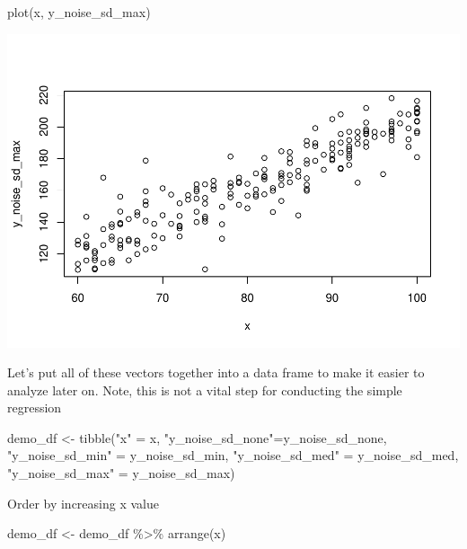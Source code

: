\documentclass[
]{book}
\newenvironment{Shaded}{\begin{snugshade}}{\end{snugshade}}
\newcommand{\FunctionTok}[1]{\textcolor[rgb]{0.00,0.00,0.00}{#1}}
\newcommand{\NormalTok}[1]{#1}
\newcommand{\OtherTok}[1]{\textcolor[rgb]{0.56,0.35,0.01}{#1}}
\newcommand{\SpecialCharTok}[1]{\textcolor[rgb]{0.00,0.00,0.00}{#1}}
\newcommand{\StringTok}[1]{\textcolor[rgb]{0.31,0.60,0.02}{#1}}
\begin{document}
\begin{Shaded}
\begin{Highlighting}[]
\FunctionTok{plot}\NormalTok{(x, y\_noise\_sd\_max)}
\end{Highlighting}
\end{Shaded}

\includegraphics{test_course_notes_files/figure-latex/remedy030-4.pdf}

Let's put all of these vectors together into a data frame to make it easier to analyze later on.
Note, this is not a vital step for conducting the simple regression

\begin{Shaded}
\begin{Highlighting}[]
\NormalTok{demo\_df }\OtherTok{\textless{}{-}} \FunctionTok{tibble}\NormalTok{(}\StringTok{"x"} \OtherTok{=}\NormalTok{ x, }
                  \StringTok{"y\_noise\_sd\_none"}\OtherTok{=}\NormalTok{y\_noise\_sd\_none, }
                  \StringTok{"y\_noise\_sd\_min"} \OtherTok{=}\NormalTok{ y\_noise\_sd\_min,}
                  \StringTok{"y\_noise\_sd\_med"} \OtherTok{=}\NormalTok{ y\_noise\_sd\_med,}
                  \StringTok{"y\_noise\_sd\_max"} \OtherTok{=}\NormalTok{ y\_noise\_sd\_max)}
\end{Highlighting}
\end{Shaded}

Order by increasing x value

\begin{Shaded}
\begin{Highlighting}[]
\NormalTok{demo\_df }\OtherTok{\textless{}{-}}\NormalTok{ demo\_df }\SpecialCharTok{\%\textgreater{}\%} 
  \FunctionTok{arrange}\NormalTok{(x)}
\end{Highlighting}
\end{Shaded}
\end{document}
